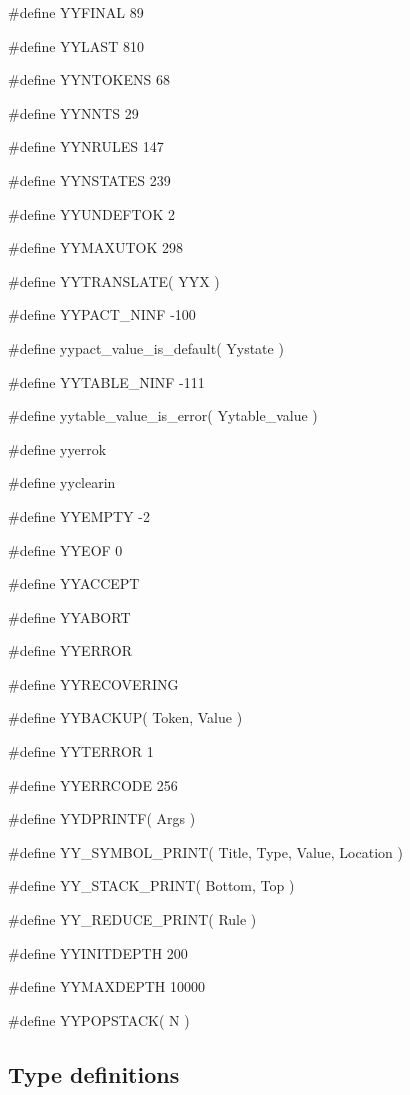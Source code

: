 \medskip
{\stt \#define YYFINAL 89}

\medskip
{\stt \#define YYLAST 810}

\medskip
{\stt \#define YYNTOKENS 68}

\medskip
{\stt \#define YYNNTS 29}

\medskip
{\stt \#define YYNRULES 147}

\medskip
{\stt \#define YYNSTATES 239}

\medskip
{\stt \#define YYUNDEFTOK 2}

\medskip
{\stt \#define YYMAXUTOK 298}

\medskip
{\stt \#define YYTRANSLATE( YYX )}

\medskip
{\stt \#define YYPACT\_NINF -100}

\medskip
{\stt \#define yypact\_value\_is\_default( Yystate )}

\medskip
{\stt \#define YYTABLE\_NINF -111}

\medskip
{\stt \#define yytable\_value\_is\_error( Yytable\_value )}

\medskip
{\stt \#define yyerrok}

\medskip
{\stt \#define yyclearin}

\medskip
{\stt \#define YYEMPTY -2}

\medskip
{\stt \#define YYEOF 0}

\medskip
{\stt \#define YYACCEPT}

\medskip
{\stt \#define YYABORT}

\medskip
{\stt \#define YYERROR}

\medskip
{\stt \#define YYRECOVERING}

\medskip
{\stt \#define YYBACKUP( Token, Value )}

\medskip
{\stt \#define YYTERROR 1}

\medskip
{\stt \#define YYERRCODE 256}

\medskip
{\stt \#define YYDPRINTF( Args )}

\medskip
{\stt \#define YY\_SYMBOL\_PRINT( Title, Type, Value, Location )}

\medskip
{\stt \#define YY\_STACK\_PRINT( Bottom, Top )}

\medskip
{\stt \#define YY\_REDUCE\_PRINT( Rule )}

\medskip
{\stt \#define YYINITDEPTH 200}

\medskip
{\stt \#define YYMAXDEPTH 10000}

\medskip
{\stt \#define YYPOPSTACK( N )}


\subsection{Type definitions}


